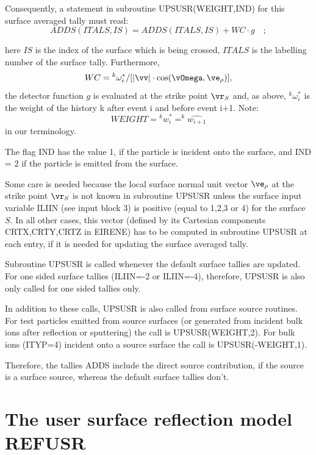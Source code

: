 Consequently, a statement in subroutine UPSUSR(WEIGHT,IND)
for this surface averaged tally must read:
\begin{displaymath}
ADDS(ITALS,IS)=ADDS(ITALS,IS) + WC   \cdot   g  \quad ;
\end{displaymath}

here $IS$ is the index of the surface which is being crossed,
$ITALS$ is the labelling number of the surface tally. Furthermore,
\begin{displaymath}
WC= {^k{\omega^{*}_i}}  /  [ |\vv |
  \cdot   \cos( \vOmega , \ve_{\rho} ) ] ,
\end{displaymath}
the detector function $g$ is evaluated at the strike point $ \vr_S $
and, as above, $ {^k{\omega^{*}_i}}  $ is the weight of the history
k after event i and before event i+1. Note:
\begin{displaymath}
 WEIGHT = {^k {w^{*}_i}}  =
^k {\hat{w_{i+1}}}
\end{displaymath}
in our terminology.

The flag IND has the value 1, if the particle is incident onto the
surface, and IND = 2 if the particle is emitted from the surface.

Some care is needed because the local surface normal unit vector $
\ve_{\rho} $ at the strike point $ \vr_S $ is not known in
subroutine UPSUSR unless the surface input variable ILIIN (see input
block 3) is positive (equal to 1,2,3 or 4) for the surface $S$. In
all other cases, this vector (defined by its Cartesian components
CRTX,CRTY,CRTZ in EIRENE) has to be computed in subroutine UPSUSR at
each entry, if it is needed for updating the surface averaged tally.

Subroutine UPSUSR is called whenever the default surface tallies are
updated. For one sided surface tallies (ILIIN=-2 or ILIIN=-4), therefore,
UPSUSR is also only called for one sided tallies only.

In addition to these calls, UPSUSR is also called from surface source routines.
For test particles emitted from source surfaces (or generated from incident bulk ions after
reflection or sputtering)
the call is UPSUSR(WEIGHT,2). For bulk ions (ITYP=4) incident onto a source surface
the call is UPSUSR(-WEIGHT,1).

Therefore, the tallies ADDS include the direct source contribution, if the source is a surface
source, whereas the default surface tallies don't.
\newpage

\section{The user surface reflection model REFUSR} \label{sec3.3}

